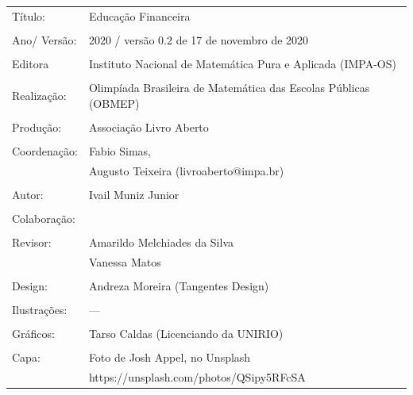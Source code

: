 
\begin{tabular}{p{}p{}}
Título: & Educação Financeira\\
\\
Ano/ Versão: & 2020 / versão 0.2 de 17 de novembro de 2020\\
\\
Editora & Instituto Nacional de Matem\'atica Pura e Aplicada (IMPA-OS)\\
\\
Realização:& Olimp\'iada Brasileira de Matem\'atica das Escolas P\'ublicas (OBMEP)\\
\\
Produção:& Associação Livro Aberto\\
\\
Coordenação: & Fabio Simas, \\
			&  Augusto Teixeira (livroaberto@impa.br)\\
\\
  Autor: & Ivail Muniz Junior\\
        
\\
Colaboração: & \\
\\
Revisor: & Amarildo Melchiades da Silva \\
         & Vanessa Matos \\
\\
Design: & Andreza Moreira (Tangentes Design) \\
\\
  Ilustrações: & --- \\ 
\\
Gráficos: & Tarso Caldas (Licenciando da UNIRIO)\\
\\
  Capa: & Foto de Josh Appel, no Unsplash \\
  		& https://unsplash.com/photos/QSipy5RFcSA \\

\end{tabular}
\vspace{.5cm}



